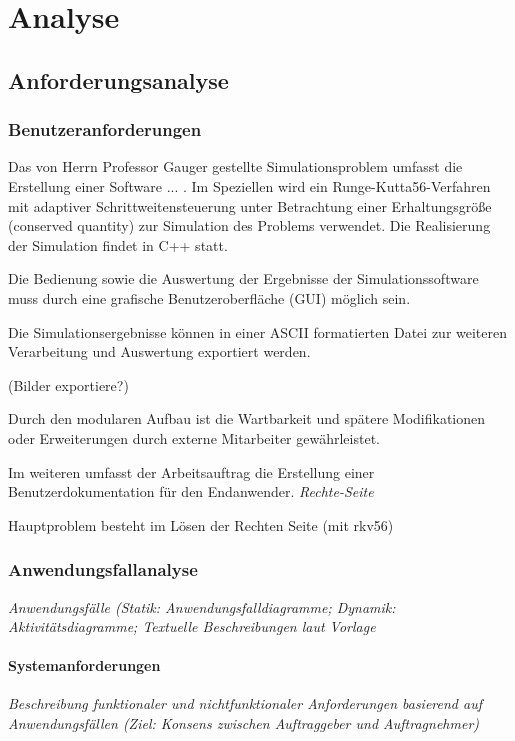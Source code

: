 \chapter{Analyse}
\label{ch:2}

\section{Anforderungsanalyse}
\label{sec:2.1}

\subsection{Benutzeranforderungen}

{Das von Herrn Professor Gauger gestellte Simulationsproblem umfasst die Erstellung einer Software ... .
Im Speziellen wird ein Runge-Kutta56-Verfahren mit adaptiver Schrittweitensteuerung unter Betrachtung einer Erhaltungsgröße (conserved quantity) zur Simulation des Problems verwendet. Die Realisierung der Simulation findet in C++ statt.

Die Bedienung sowie die Auswertung der Ergebnisse der Simulationssoftware muss durch eine grafische Benutzeroberfläche (GUI) möglich sein.

Die Simulationsergebnisse können in einer ASCII formatierten Datei zur weiteren Verarbeitung und Auswertung exportiert werden.

(Bilder exportiere?) 

Durch den modularen Aufbau ist die Wartbarkeit und spätere Modifikationen oder Erweiterungen durch externe Mitarbeiter gewährleistet. 


Im weiteren umfasst der Arbeitsauftrag die Erstellung einer Benutzerdokumentation für den Endanwender. 
\em Rechte-Seite

Hauptproblem besteht im Lösen der Rechten Seite (mit rkv56) }

\subsection{Anwendungsfallanalyse}

{\em Anwendungsf\"alle (Statik: Anwendungsfalldiagramme; Dynamik: 
Aktivit\"atsdiagramme; Textuelle Beschreibungen laut Vorlage}

\subsubsection{Systemanforderungen}

{\em Beschreibung funktionaler und nichtfunktionaler Anforderungen basierend
auf Anwendungsf\"allen (Ziel: Konsens zwischen Auftraggeber und Auftragnehmer)}


